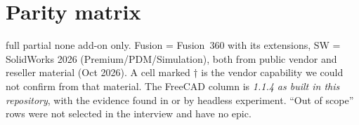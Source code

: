 \section{Parity matrix}\label{app:parity}

\pfull{} full \quad \phalf{} partial \quad \pnone{} none \quad \padd{} add-on only. Fusion = Fusion~360 with
its extensions, SW = SolidWorks 2026 (Premium/PDM/Simulation), both from public vendor and reseller material
(Oct 2026). A cell marked † is the vendor capability we could not confirm from that material. The FreeCAD column is
\emph{1.1.4 as built in this repository}, with the evidence found in  or by headless experiment.
``Out of scope'' rows were not selected in the interview and have no epic.

